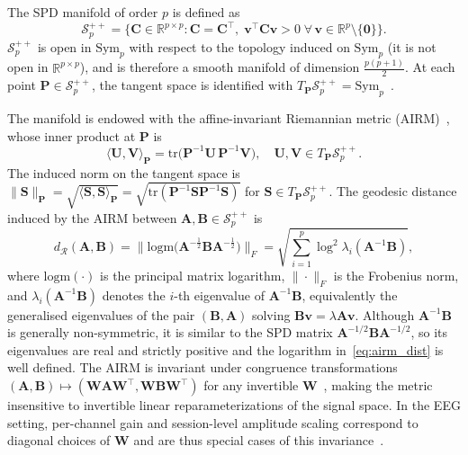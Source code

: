 The SPD manifold of order $p$ is defined as
\begin{equation}
  \mathcal{S}^{++}_p = \bigl\{\mathbf{C}\in\mathbb{R}^{p\times p}
    : \mathbf{C} = \mathbf{C}^\top,\;
    \mathbf{v}^\top\mathbf{C}\mathbf{v} > 0\;
    \forall\,\mathbf{v}\in\mathbb{R}^p\setminus\{\mathbf{0}\}\bigr\}.
  \label{eq:spd_def}
\end{equation}
$\mathcal{S}^{++}_p$ is open in $\mathrm{Sym}_p$ with respect to the topology
induced on $\mathrm{Sym}_p$ (it is not open in $\mathbb{R}^{p\times p}$), and is
therefore a smooth manifold of dimension $\tfrac{p(p+1)}{2}$.
At each point $\mathbf{P}\in\mathcal{S}^{++}_p$, the tangent space is identified
with $T_\mathbf{P}\mathcal{S}^{++}_p = \mathrm{Sym}_p$~\cite{absil2008optimization}.

The manifold is endowed with the affine-invariant Riemannian metric
(AIRM)~\cite{pennec2006riemannian}, whose inner product at $\mathbf{P}$ is
\begin{equation}
  \langle \mathbf{U}, \mathbf{V}\rangle_\mathbf{P}
    = \mathrm{tr}\!\bigl(\mathbf{P}^{-1}\mathbf{U}\,\mathbf{P}^{-1}\mathbf{V}\bigr),
    \quad \mathbf{U},\mathbf{V}\in T_\mathbf{P}\mathcal{S}^{++}_p.
  \label{eq:airm_inner}
\end{equation}
The induced norm on the tangent space is
$\|\mathbf{S}\|_\mathbf{P} = \sqrt{\langle\mathbf{S},\mathbf{S}\rangle_\mathbf{P}}
= \sqrt{\mathrm{tr}(\mathbf{P}^{-1}\mathbf{S}\mathbf{P}^{-1}\mathbf{S})}$
for $\mathbf{S}\in T_\mathbf{P}\mathcal{S}^{++}_p$.
The geodesic distance induced by the AIRM between
$\mathbf{A}, \mathbf{B}\in\mathcal{S}^{++}_p$ is
\begin{equation}
  d_\mathcal{R}(\mathbf{A},\mathbf{B})
    = \bigl\|\mathrm{logm}\bigl(\mathbf{A}^{-\frac{1}{2}}\mathbf{B}
        \mathbf{A}^{-\frac{1}{2}}\bigr)\bigr\|_F
    = \sqrt{\sum_{i=1}^{p}\log^2\!\lambda_i(\mathbf{A}^{-1}\mathbf{B})},
  \label{eq:airm_dist}
\end{equation}
where $\mathrm{logm}(\cdot)$ is the principal matrix logarithm,
$\|\cdot\|_F$ is the Frobenius norm, and $\lambda_i(\mathbf{A}^{-1}\mathbf{B})$
denotes the $i$-th eigenvalue of $\mathbf{A}^{-1}\mathbf{B}$, equivalently the
generalised eigenvalues of the pair $(\mathbf{B},\mathbf{A})$ solving
$\mathbf{B}\mathbf{v}=\lambda\mathbf{A}\mathbf{v}$.
Although $\mathbf{A}^{-1}\mathbf{B}$ is generally non-symmetric, it is similar to
the SPD matrix $\mathbf{A}^{-1/2}\mathbf{B}\mathbf{A}^{-1/2}$, so its eigenvalues
are real and strictly positive and the logarithm in~\eqref{eq:airm_dist} is
well defined.
The AIRM is invariant under congruence transformations
$(\mathbf{A},\mathbf{B})\mapsto(\mathbf{W}\mathbf{A}\mathbf{W}^\top,
\mathbf{W}\mathbf{B}\mathbf{W}^\top)$ for any invertible
$\mathbf{W}$~\cite{pennec2006riemannian}, making the metric insensitive to
invertible linear reparameterizations of the signal space. In the EEG setting,
per-channel gain and session-level amplitude scaling correspond to diagonal
choices of $\mathbf{W}$ and are thus special cases of this
invariance~\cite{barachant2012multiclass}.

